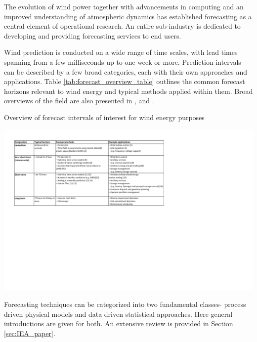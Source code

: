 The evolution of wind power together with advancements in computing and an improved understanding of atmospheric dynamics has established forecasting as a central element of operational research. An entire sub-industry is dedicated to developing and providing forecasting services to end users.

Wind prediction is conducted on a wide range of time scales, with lead times spanning from a few milliseconds up to one week or more. Prediction intervals can be described by a few broad categories, each with their own approaches and applications. Table \ref{tab:forecast_overview_table} outlines the common forecast horizons relevant to wind energy and typical methods applied within them. Broad overviews of the field are also presented in \cite{costa_review_2008}, \cite{giebel_state---art_2011} and \cite{soman_review_2010}.

\begin{table}
    \centering
    \caption{Overview of forecast intervals of interest for wind energy purposes}
    \includegraphics[width=1.0\textwidth]{tables/forecast_overview_table.pdf}
    
    \label{tab:forecast_overview_table}
\end{table}

Forecasting techniques can be categorized into two fundamental classes- process driven physical models and data driven statistical approaches. Here general introductions are given for both. An extensive review is provided in Section \ref{sec:IEA_paper}.

